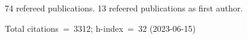 74 refereed publications. 13 refeered publications as first author.

Total citations~=~3312; h-index~=~32 (2023-06-15)
